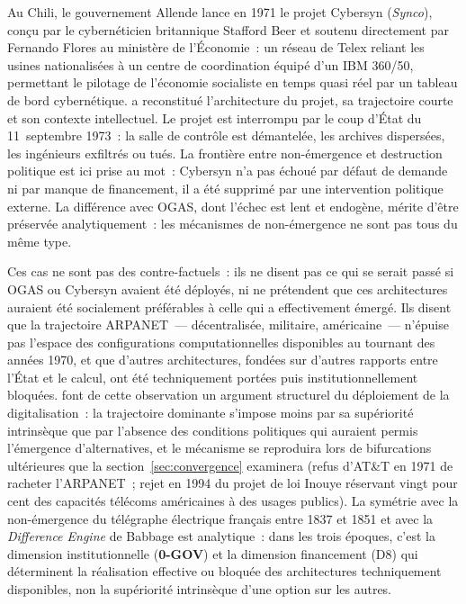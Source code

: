 %
Au Chili, le gouvernement Allende lance en 1971 le projet Cybersyn (\emph{Synco}), conçu par le cybernéticien britannique Stafford Beer et soutenu directement par Fernando Flores au ministère de l'Économie~: un réseau de Telex reliant les usines nationalisées à un centre de coordination équipé d'un IBM 360/50, permettant le pilotage de l'économie socialiste en temps quasi réel par un tableau de bord cybernétique. \textcite{medina_cybernetic_2011} a reconstitué l'architecture du projet, sa trajectoire courte et son contexte intellectuel. Le projet est interrompu par le coup d'État du 11~septembre 1973~: la salle de contrôle est démantelée, les archives dispersées, les ingénieurs exfiltrés ou tués. La frontière entre non-émergence et destruction politique est ici prise au mot~: Cybersyn n'a pas échoué par défaut de demande ni par manque de financement, il a été supprimé par une intervention politique externe. La différence avec OGAS, dont l'échec est lent et endogène, mérite d'être préservée analytiquement~: les mécanismes de non-émergence ne sont pas tous du même type.

%
Ces cas ne sont pas des contre-factuels~: ils ne disent pas ce qui se serait passé si OGAS ou Cybersyn avaient été déployés, ni ne prétendent que ces architectures auraient été socialement préférables à celle qui a effectivement émergé. Ils disent que la trajectoire ARPANET~--- décentralisée, militaire, américaine~--- n'épuise pas l'espace des configurations computationnelles disponibles au tournant des années 1970, et que d'autres architectures, fondées sur d'autres rapports entre l'État et le calcul, ont été techniquement portées puis institutionnellement bloquées. \textcite{johnstone_deep_2026} font de cette observation un argument structurel du déploiement de la digitalisation~: la trajectoire dominante s'impose moins par sa supériorité intrinsèque que par l'absence des conditions politiques qui auraient permis l'émergence d'alternatives, et le mécanisme se reproduira lors de bifurcations ultérieures que la section~\ref{sec:convergence} examinera (refus d'AT\&T en 1971 de racheter l'ARPANET~; rejet en 1994 du projet de loi Inouye réservant vingt pour cent des capacités télécoms américaines à des usages publics). La symétrie avec la non-émergence du télégraphe électrique français entre 1837 et 1851 et avec la \emph{Difference Engine} de Babbage est analytique~: dans les trois époques, c'est la dimension institutionnelle (\textbf{0-GOV}) et la dimension financement (D8) qui déterminent la réalisation effective ou bloquée des architectures techniquement disponibles, non la supériorité intrinsèque d'une option sur les autres.

